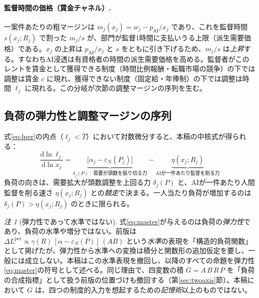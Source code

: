 \documentclass[11pt]{article}
\theoremstyle{plain}
\theoremstyle{definition}
\theoremstyle{remark}
\newtheorem*{rmk}{注}
\begin{document}
\paragraph{監督時間の価格（賃金チャネル）.}
一案件あたりの粗マージンは $m_j(x_j)=w_j-p_{\mathrm{AI}}/x_j$ であり、これを監督時間 $s(x_j;R_j)$ で割った $m_j/s$ が、部門が監督1時間に支払いうる上限（派生需要価格）である。$x_j$ の上昇は $p_{\mathrm{AI}}/x_j$ と $s$ をともに引き下げるため、$m_j/s$ は\emph{上昇}する。すなわちAI浸透は有資格者の時間の派生需要価格を高める。監督者がこのレントを賃金として獲得できる制度（時間比例報酬・転職市場の競争）の下では調整は賃金 $c$ に現れ、獲得できない制度（固定給・年俸制）の下では調整は時間 $\ell_j$ に現れる。この分岐が次節の調整マージンの序列を生む。

\subsection{負荷の弾力性と調整マージンの序列}\label{sec:margins}
式\eqref{eq:lper}の内点（$\ell_j<\bar T$）において対数微分すると、本稿の中核式が得られる：
\begin{equation}\label{eq:master}
\boxed{\;\frac{\mathrm d\ln \ell_j}{\mathrm d\ln x_j}
=\underbrace{\bigl[\alpha_j-\varepsilon_N(P_j)\bigr]}_{\textstyle \delta_j(P)\;:\;\text{需要が頭数を振り切る力}}
-\underbrace{\eta(x_j;R_j)}_{\textstyle \text{AIが一件あたり監督を削る力}}\;}
\end{equation}
負荷の向きは、需要拡大が頭数調整を上回る力 $\delta_j(P)$ と、AIが一件あたり人間監督を削る速さ $\eta(x_j;R_j)$ との\emph{競走}で決まる。一人当たり負荷が増加するのは $\delta_j(P)>\eta(x_j;R_j)$ のときに限られる。

\begin{rmk}[弾力性であって水準ではない]\label{rmk:elasticity}
式\eqref{eq:master}が与えるのは負荷の\emph{弾力性}であり、負荷の水準や増分ではない。前版は $\Delta L^{\text{per}}\propto\gamma(R)\,[\alpha-\varepsilon_N(P)]\,(AB)$ という\emph{水準}の表現を「構造的負荷関数」として掲げたが、弾力性から水準への変換は積分と関数形の追加仮定を要し、一般には成立しない。本稿はこの水準表現を撤回し、以降のすべての命題を弾力性\eqref{eq:master}の符号として述べる。同じ理由で、四変数の積 $G=A\,B\,R\,P$ を「負荷の合成指標」として扱う前版の位置づけも撤回する（第\ref{sec:twoaxis}節）。本稿において $G$ は、四つの制度的入力を想起するための\emph{記憶術}以上のものではない。
\end{rmk}
\end{document}
